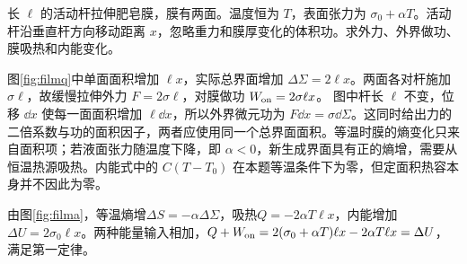 \begin{example}[液膜等温拉伸的热与功]
长 $\ell$ 的活动杆拉伸肥皂膜，膜有两面。温度恒为 $T$，表面张力为 $\sigma_0+\alpha T$。活动杆沿垂直杆方向移动距离 $x$，忽略重力和膜厚变化的体积功。求外力、外界做功、膜吸热和内能变化。
\end{example}
\begin{solution}
图\ref{fig:filmq}中单面面积增加 $\ell x$，实际总界面增加 $\Delta\Sigma=2\ell x$。两面各对杆施加 $\sigma\ell$，故缓慢拉伸外力 $F=2\sigma\ell$，对膜做功 $W_{\rm on}=2\sigma\ell x$。
图中杆长 $\ell$ 不变，位移 $\dd x$ 使每一面面积增加 $\ell\dd x$，所以外界微元功为 $F\dd x=\sigma\dd\Sigma$。这同时给出力的二倍系数与功的面积因子，两者应使用同一个总界面面积。等温时膜的熵变化只来自面积项；若液面张力随温度下降，即 $\alpha<0$，新生成界面具有正的熵增，需要从恒温热源吸热。内能式中的 $C(T-T_0)$ 在本题等温条件下为零，但定面积热容本身并不因此为零。

由图\ref{fig:filma}，等温熵增$\Delta S=-\alpha\Delta\Sigma$，吸热$Q=-2\alpha T\ell x$，内能增加$\Delta U=2\sigma_0\ell x$。两种能量输入相加，$Q+W_{\rm on}=2(\sigma_0+\alpha T)\ell x-2\alpha T\ell x=\Delta U$，满足第一定律。
\end{solution}

